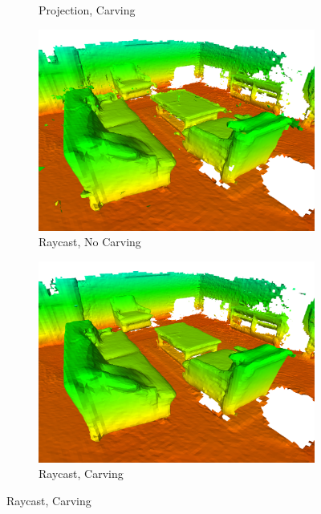 \documentclass[conference]{IEEEtran}
\begin{document}
\begin{figure} [htb]
\begin{minipage}[b]{1.0\linewidth}
\begin{subfigure}[b]{0.47\textwidth}
	 			 \caption{Projection,  Carving}
	 			 \label{fig:proj-carv}
	 		\end{subfigure}
	 		\begin{subfigure}[b]{0.47\textwidth} \centering
	 			\includegraphics[width=1.0\textwidth]{img/fig-apt-trav-nocarv.png}
	 			 \caption{Raycast,  No Carving}
	 			  \label{fig:ray-nocarv}
	 		\end{subfigure}
	 		\begin{subfigure}[b]{0.47\textwidth} \centering
	 			\includegraphics[width=1.0\textwidth]{img/fig-apt-trav-carv.png}
	 			 \caption{Raycast,  Carving}
	 			 \label{fig:ray-carv}
	 		\end{subfigure}
 		\end{minipage}
 	  \begin{subtable}[b]{1.0\linewidth} \centering

\end{subtable}
\end{figure}
\end{document}
